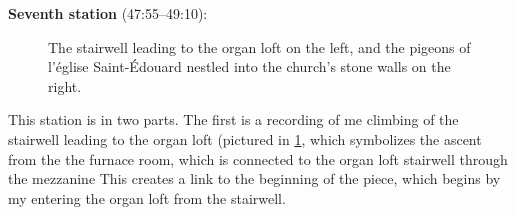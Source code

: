\documentclass[12pt,twoside,maitrise]{dms_ks}
\theoremstyle{definition}
\begin{document}
{\textbf{Seventh station} (47:55--49:10):

\begin{figure}[h]
    \centering
    \caption{The stairwell leading to the organ loft on the left, and the pigeons of l'église Saint-Édouard nestled into the church's stone walls on the right.}
    \label{fig:station7}
\end{figure}

This station is in two parts. 
The first is a recording of me climbing of the stairwell leading to the organ loft (pictured in \cref{fig:station7}, which symbolizes the ascent from the the furnace room, which is connected to the organ loft stairwell through the mezzanine
This creates a link to the beginning of the piece, which begins by my entering the organ loft from the stairwell. 

}
\end{document}
